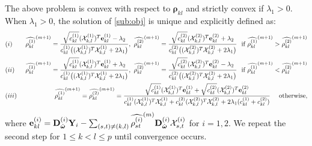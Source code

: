 \documentclass[useAMS,usenatbib,referee]{bio}
\newcommand{\bs}{\boldsymbol}
\begin{document}
{The above problem is convex with respect to $\bs{\rho}_{kl}$ and strictly convex if $\lambda_1 > 0$. When $\lambda_1 > 0$, the solution of \eqref{sub:obj} is unique and explicitly defined as:
\begin{eqnarray} \nonumber
&(i)&~\displaystyle \widehat{\rho^{(1)}_{kl}}^{(m+1)}
= \frac{\sqrt{c^{(1)}_{kl}}(\mathcal{X}^{(1)}_{k,l})^T{\bf e}^{(1)}_{kl} - \lambda_2 }{c^{(1)}_{kl}\big((\mathcal{X}^{(1)}_{k,l})^T
\mathcal{X}^{(1)}_{k,l}+2\lambda_1\big)},~ 
\widehat{\rho^{(2)}_{kl}}^{(m+1)}
= \frac{\sqrt{c^{(2)}_{kl}}(\mathcal{X}^{(2)}_{k,l})^T{\bf e}^{(2)}_{kl} + \lambda_2 }{c^{(2)}_{kl}\big((\mathcal{X}^{(2)}_{k,l})^T
\mathcal{X}^{(2)}_{k,l}+2\lambda_1 \big)}  ~\mbox{  if  } \widehat{\rho^{(1)}_{kl}}^{(m+1)} > \widehat{\rho^{(2)}_{kl}}^{(m+1)}\\ \nonumber
&(ii)&~\displaystyle \widehat{\rho^{(1)}_{kl}}^{(m+1)}
= \frac{\sqrt{c^{(1)}_{kl}}(\mathcal{X}^{(1)}_{k,l})^T{\bf e}^{(1)}_{kl} + \lambda_2 }{c^{(1)}_{kl}\big((\mathcal{X}^{(1)}_{k,l})^T
\mathcal{X}^{(1)}_{k,l}+2\lambda_1\big)},~ 
\widehat{\rho^{(2)}_{kl}}^{(m+1)}
= \frac{\sqrt{c^{(2)}_{kl}}(\mathcal{X}^{(2)}_{k,l})^T{\bf e}^{(2)}_{kl} - \lambda_2 }{c^{(2)}_{kl}\big((\mathcal{X}^{(2)}_{k,l})^T
\mathcal{X}^{(2)}_{k,l}+2\lambda_1\big)}  ~\mbox{  if  } \widehat{\rho^{(1)}_{kl}}^{(m+1)} < \widehat{\rho^{(2)}_{kl}}^{(m+1)}\\ \nonumber
&(iii)&~\displaystyle \widehat{\rho^{(1)}_{kl}}^{(m+1)}
= \widehat{\rho^{(2)}_{kl}}^{(m+1)}
= \frac{\sqrt{c^{(1)}_{kl}}(\mathcal{X}^{(1)}_{k,l})^T{\bf e}^{(1)}_{kl}+\sqrt{c^{(2)}_{kl}}(\mathcal{X}^{(2)}_{k,l})^T{\bf e}^{(2)}_{kl} }{c^{(1)}_{kl}(\mathcal{X}^{(1)}_{k,l})^T
\mathcal{X}^{(1)}_{k,l}+c^{(2)}_{kl}(\mathcal{X}^{(2)}_{k,l})^T
\mathcal{X}^{(2)}_{k,l}+2\lambda_1(c^{(1)}_{kl}+c^{(2)}_{kl})}  ~~~\mbox{ otherwise},
\end{eqnarray}
where $ {\bf e}^{(i)}_{kl} = {\bf D}_{\hat{\bs{\omega}}}^{(i)}\mathbf{Y}_i - \sum_{(s,t) \neq (k,l)} \widehat{\rho^{(i)}_{st}}^{(m)} {\bf D}_{\hat{\bs{\omega}}}^{(i)} \mathcal{X}^{(i)}_{s,t}$ for $i=1,2$.
We repeat the second step for $1\le k<l \le p$ until convergence occurs.



}
\end{document}
